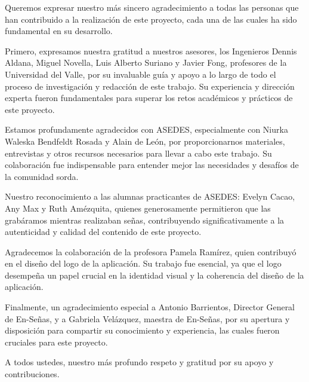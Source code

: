 Queremos expresar nuestro más sincero agradecimiento a todas las personas que han contribuido a la realización de este proyecto, cada una de las cuales ha sido fundamental en su desarrollo.

Primero, expresamos nuestra gratitud a nuestros asesores, los Ingenieros Dennis Aldana, Miguel Novella, Luis Alberto Suriano y Javier Fong, profesores de la Universidad del Valle, por su invaluable guía y apoyo a lo largo de todo el proceso de investigación y redacción de este trabajo. Su experiencia y dirección experta fueron fundamentales para superar los retos académicos y prácticos de este proyecto.

Estamos profundamente agradecidos con ASEDES, especialmente con Niurka Waleska Bendfeldt Rosada y Alain de León, por proporcionarnos materiales, entrevistas y otros recursos necesarios para llevar a cabo este trabajo. Su colaboración fue indispensable para entender mejor las necesidades y desafíos de la comunidad sorda.

Nuestro reconocimiento a las alumnas practicantes de ASEDES: Evelyn Cacao, Any Max y Ruth Amézquita, quienes generosamente permitieron que las grabáramos mientras realizaban señas, contribuyendo significativamente a la autenticidad y calidad del contenido de este proyecto.

Agradecemos la colaboración de la profesora Pamela Ramírez, quien contribuyó en el diseño del logo de la aplicación. Su trabajo fue esencial, ya que el logo desempeña un papel crucial en la identidad visual y la coherencia del diseño de la aplicación.

Finalmente, un agradecimiento especial a Antonio Barrientos, Director General de En-Señas, y a Gabriela Velázquez, maestra de En-Señas, por su apertura y disposición para compartir su conocimiento y experiencia, las cuales fueron cruciales para este proyecto.

A todos ustedes, nuestro más profundo respeto y gratitud por su apoyo y contribuciones.
